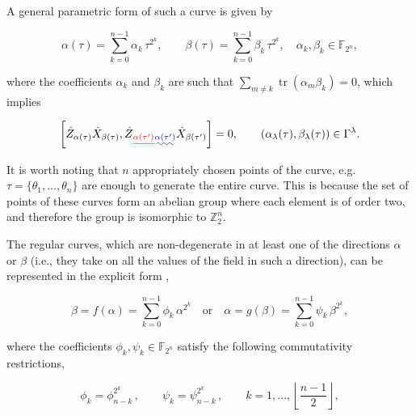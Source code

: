 \documentclass[quantumrep,article,submit,pdftex,moreauthors]{Definitions/mdpi}
\DeclareMathOperator{\tr}{tr}
\providecommand{\DIFadd}[1]{{\protect\color{blue}\uwave{#1}}} %
\providecommand{\DIFdel}[1]{{\protect\color{red}\sout{#1}}}                      %
\providecommand{\DIFaddbegin}{} %
\providecommand{\DIFaddend}{} %
\providecommand{\DIFdelbegin}{} %
\providecommand{\DIFdelend}{} %
\begin{document}
A general parametric form of such a curve is given by

\begin{equation}
  \alpha (\tau)
  = \sum_{k=0}^{n-1}\alpha_{k}\,\tau^{2^{k}}, \qquad \beta(\tau)
  = \sum_{k=0}^{n-1}\beta_{k} \, \tau^{2^{k}},
  \quad \alpha_{k},\beta_{k}\in \mathbb{F}_{2^{n}},
  \label{curve1a}
\end{equation}

where the coefficients $\alpha_k$ and $\beta_k$ are such that $\sum_{m \neq k}
\tr(\alpha_{m}\beta_{k})=0$, which implies

\begin{equation}
  \DIFdelbegin %
\DIFdelend \DIFaddbegin \left[
    \DIFaddend \hat{Z}_{\alpha (\tau )}\hat{X}_{\beta (\tau )},
    \hat{Z}\DIFdelbegin \DIFdel{_{\alpha (\tau^{\prime })}}\DIFdelend \DIFaddbegin \DIFadd{_{\alpha(\tau^{\prime })}}\DIFaddend \hat{X}_{\beta(\tau^{\prime})}
  \DIFdelbegin %
\DIFdelend \DIFaddbegin \right] \DIFaddend = 0,
  \qquad \left( \alpha_{\lambda}(\tau),\beta_{\lambda}(\tau) \right)
  \in \Gamma^{\lambda }.
  \label{stab}
\end{equation}

It is worth noting that $n$ appropriately chosen points of the curve, e.g. $\tau
= \{\theta _{1},\ldots,\theta_{n}\}$ are enough to generate the entire curve.
This is because the set of points of these curves form an abelian group where
each element is of order two, and therefore the group is isomorphic to
\DIFdelbegin \DIFdel{$\mathbb
Z_{2}^n$}\DIFdelend \DIFaddbegin \DIFadd{$\mathbb{Z}_{2}^n$}\DIFaddend .

The regular curves, which are non-degenerate in at least one of the directions
$\alpha$ or $\beta$ (i.e., they take on all the values of the field in such a
direction), can be represented in the explicit form \cite{GS2},

\begin{equation}
  \beta = f(\alpha)
  = \sum_{k=0}^{n-1} \phi_{k} \, \alpha^{2^{k}}
  \quad \text{or} \quad
  \alpha = g(\beta) = \sum_{k=0}^{n-1} \psi_{k}\,\beta^{2^{k}},
  \label{RC}
\end{equation}

where the coefficients $\phi_{k},\psi_{k} \in \mathbb{F}_{2^{n}}$ satisfy the
following commutativity restrictions,

\begin{equation}
  \phi_{k} = \phi _{n-k}^{2^{k}}\,,
  \qquad \psi_{k} = \psi_{n-k}^{2^{k}}\,,
  \qquad k=1,\ldots, \left\lfloor \frac{n-1}{2}\right\rfloor,
  \label{Acc}
\end{equation}
\end{document}
